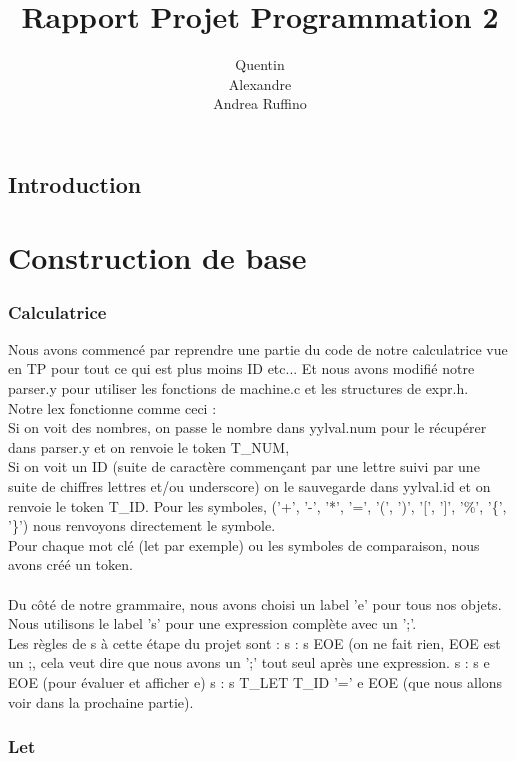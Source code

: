\documentclass{report}
\title{\textbf{Rapport Projet Programmation 2}}
\author{
	\bsc {Menini} Quentin\\
	\bsc {Brebant} Alexandre\\
	\bsc {Randriamalazavola} Andrea Ruffino}
\begin{document}
\maketitle

\tableofcontents

\chapter*{Introduction}

\part{Construction de base}

\section{Calculatrice}

Nous avons commencé par reprendre une partie du code de notre calculatrice vue en TP pour tout ce qui est plus moins ID etc... Et nous avons modifié notre parser.y pour utiliser les fonctions de machine.c et les structures de expr.h.\\
Notre lex fonctionne comme ceci :\\
Si on voit des nombres, on passe le nombre dans yylval.num pour le récupérer dans parser.y et on renvoie le token T\_NUM,\\
Si on voit un ID (suite de caractère commençant par une lettre suivi par une suite de chiffres lettres et/ou underscore) on le sauvegarde dans yylval.id et on renvoie le token T\_ID.
Pour les symboles, ('+', '-', '*', '=', '(', ')', '[', ']', '\%', '\{', '\}') nous renvoyons directement le symbole.\\
Pour chaque mot clé (let par exemple) ou les symboles de comparaison, nous avons créé un token.\\
\\
Du côté de notre grammaire, nous avons choisi un label 'e' pour tous nos objets.
Nous utilisons le label 's' pour une expression complète avec un ';'.\\
Les règles de s à cette étape du projet sont :
s : s EOE (on ne fait rien, EOE est un ;, cela veut dire que nous avons un ';' tout seul après une expression.
s : s e EOE (pour évaluer et afficher e)
s : s T\_LET T\_ID '=' e EOE (que nous allons voir dans la prochaine partie).

\section{Let}
\end{document}
